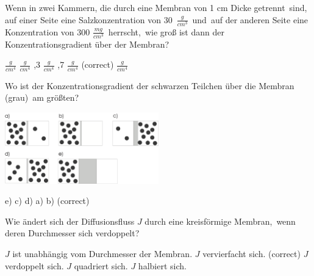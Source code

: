 \documentclass[11pt]{exam}
\begin{document}
\setlength{\voffset}{-0.5in}
\setlength{\headsep}{5pt}

\hspace{2mm}
 \hspace{5mm}
\vspace{4mm}

\begin{questions}

\question Wenn in zwei Kammern, die durch eine Membran von 1 cm Dicke getrennt sind, auf einer Seite eine Salzkonzentration von 30 \( \frac{g}{cm^3} \) und auf der anderen Seite eine Konzentration von 300 \( \frac{mg}{cm^3} \) herrscht, wie groß ist dann der Konzentrationsgradient über der Membran?

\begin{choices}
	 \( \frac{g}{cm^4} \)
	 \( \frac{g}{cm^4} \)
	,3 \( \frac{g}{cm^4} \)
	,7 \( \frac{g}{cm^4} \) (correct)
	 \( \frac{g}{cm^4} \)
\end{choices}

\vspace{3mm}\question Wo ist der Konzentrationsgradient der schwarzen Teilchen über die Membran (grau) am größten? 

\includegraphics[width=0.5\textwidth]{../../../questions/E/images/Diffusion.png}

\begin{choices}
	\choice e)
	\choice c)
	\choice d)
	\choice a)
	\choice b) (correct)
\end{choices}

\vspace{3mm}\question Wie ändert sich der Diffusionsfluss \( J \) durch eine kreisförmige Membran, wenn deren Durchmesser sich verdoppelt?

\begin{choices}
	\choice \( J \) ist unabhängig vom Durchmesser der Membran.
	\choice \( J \) vervierfacht sich. (correct)
	\choice \( J \) verdoppelt sich.
	\choice \( J \) quadriert sich.
	\choice \( J \) halbiert sich.
\end{choices}


\end{questions}
\end{document}
